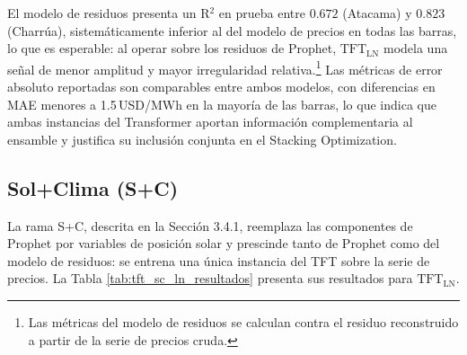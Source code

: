 El modelo de residuos presenta un R$^2$ en prueba entre $0.672$ (Atacama) y $0.823$ (Charrúa), sistemáticamente inferior al del modelo de precios en todas las barras, lo que es esperable: al operar sobre los residuos de Prophet, $\text{TFT}_\text{LN}$ modela una señal de menor amplitud y mayor irregularidad relativa.\footnote{Las métricas del modelo de residuos se calculan contra el residuo reconstruido a partir de la serie de precios cruda.} Las métricas de error absoluto reportadas son comparables entre ambos modelos, con diferencias en MAE menores a 1.5\,USD/MWh en la mayoría de las barras, lo que indica que ambas instancias del Transformer aportan información complementaria al ensamble y justifica su inclusión conjunta en el Stacking Optimization.

\subsection{Sol+Clima (S+C)}

La rama S+C, descrita en la Sección 3.4.1, reemplaza las componentes de Prophet por variables de posición solar y prescinde tanto de Prophet como del modelo de residuos: se entrena una única instancia del TFT sobre la serie de precios. La Tabla \ref{tab:tft_sc_ln_resultados} presenta sus resultados para $\text{TFT}_\text{LN}$.

